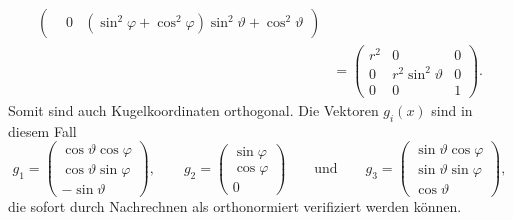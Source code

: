 \begin{beispiel}
\begin{align*}
\begin{pmatrix}
&0
&(\sin^2\varphi+\cos^2\varphi)\sin^2\vartheta + \cos^2\vartheta
\end{pmatrix}
\\
&=
\begin{pmatrix}
r^2 &         0           & 0 \\
 0  & r^2 \sin^2\vartheta & 0 \\
 0  &         0           & 1
\end{pmatrix}.
\end{align*}
Somit sind auch Kugelkoordinaten orthogonal.
Die Vektoren $g_i(x)$ sind in diesem Fall
\[
g_1
=
\begin{pmatrix}
\cos\vartheta\cos\varphi\\
\cos\vartheta\sin\varphi\\
-\sin\vartheta
\end{pmatrix}
,\qquad
g_2
=
\begin{pmatrix}
\sin\varphi\\
\cos\varphi\\
0
\end{pmatrix}
\qquad\text{und}\qquad
g_3
=
\begin{pmatrix}
\sin\vartheta\cos\varphi\\
\sin\vartheta\sin\varphi\\
\cos\vartheta
\end{pmatrix},
\]
die sofort durch Nachrechnen als orthonormiert verifiziert werden können.
\end{beispiel}

